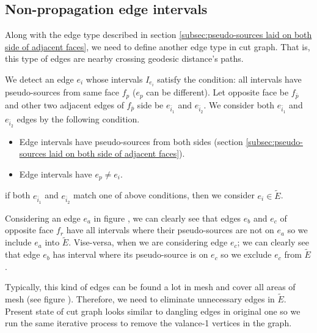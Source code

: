 \documentclass[a4paper,twoside]{article}
\begin{document}
\subsection{Non-propagation edge intervals}
\label{subsec:intervals fail to propagate}
Along with the edge type described in section \ref{subsec:pseudo-sources laid on both side of adjacent faces},  we need to define another edge type in cut graph. That is, this type of edges are nearby crossing geodesic distance's paths.

We detect an edge $e_i$ whose intervals $I_{e_i}$ satisfy the condition: all intervals have pseudo-sources from same face $f_p$ ($e_p$ can be different). Let opposite face be $f_{\bar{p}}$ and other two adjacent edges of $f_{\bar{p}}$ side be $e_{\bar{i}_1}$ and $e_{\bar{i}_2}$. We consider both $e_{\bar{i}_1}$ and $e_{\bar{i}_2}$ edges by the following condition.
\begin{itemize}
	\item Edge intervals have pseudo-sources from both sides (section \ref{subsec:pseudo-sources laid on both side of adjacent faces}).
	\item Edge intervals have $e_p \neq e_i$.
\end{itemize}

if both $e_{\bar{i}_1}$ and $e_{\bar{i}_2}$ match one of above conditions, then we consider $e_i \in \tilde{E}$. 

Considering an edge $e_a$ in figure , we can clearly see that edges $e_b$ and $e_c$ of opposite face $f_r$ have all intervals where their pseudo-sources are not on $e_a$ so we include $e_a$ into $\tilde{E}$. Vise-versa, when we are considering edge $e_c$; we can clearly see that edge $e_b$ has interval where its pseudo-source is on $e_c$ so we exclude $e_c$ from $\tilde{E}$.

Typically, this kind of edges can be found a lot in mesh and cover all areas of mesh (see figure ). Therefore, we need to eliminate unnecessary edges in $\tilde{E}$. Present state of cut graph looks similar to dangling edges in original one so we run the same iterative process to remove the valance-1 vertices in the graph. 
\end{document}
